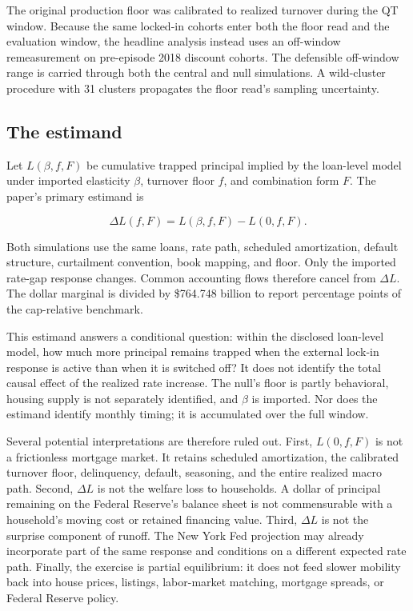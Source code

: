 The original production floor was calibrated to realized turnover during the QT window. Because the same locked-in cohorts enter both the floor read and the evaluation window, the headline analysis instead uses an off-window remeasurement on pre-episode 2018 discount cohorts. The defensible off-window range is carried through both the central and null simulations. A wild-cluster procedure with 31 clusters propagates the floor read's sampling uncertainty.

\subsection{The estimand}

Let $L(\beta,f,F)$ be cumulative trapped principal implied by the loan-level model under imported elasticity $\beta$, turnover floor $f$, and combination form $F$. The paper's primary estimand is

\begin{equation}
\Delta L(f,F)=L(\beta,f,F)-L(0,f,F).
\label{eq:marginal}
\end{equation}

Both simulations use the same loans, rate path, scheduled amortization, default structure, curtailment convention, book mapping, and floor. Only the imported rate-gap response changes. Common accounting flows therefore cancel from $\Delta L$. The dollar marginal is divided by \$764.748 billion to report percentage points of the cap-relative benchmark.

This estimand answers a conditional question: within the disclosed loan-level model, how much more principal remains trapped when the external lock-in response is active than when it is switched off? It does not identify the total causal effect of the realized rate increase. The null's floor is partly behavioral, housing supply is not separately identified, and $\beta$ is imported. Nor does the estimand identify monthly timing; it is accumulated over the full window.

Several potential interpretations are therefore ruled out. First, $L(0,f,F)$ is not a frictionless mortgage market. It retains scheduled amortization, the calibrated turnover floor, delinquency, default, seasoning, and the entire realized macro path. Second, $\Delta L$ is not the welfare loss to households. A dollar of principal remaining on the Federal Reserve's balance sheet is not commensurable with a household's moving cost or retained financing value. Third, $\Delta L$ is not the surprise component of runoff. The New York Fed projection may already incorporate part of the same response and conditions on a different expected rate path. Finally, the exercise is partial equilibrium: it does not feed slower mobility back into house prices, listings, labor-market matching, mortgage spreads, or Federal Reserve policy.

